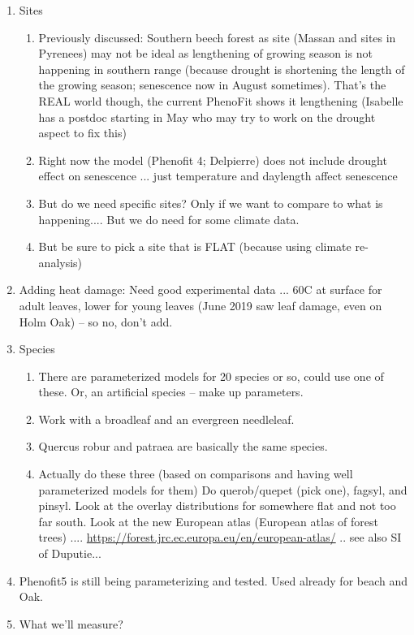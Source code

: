 \documentclass[11pt,letter]{article}
\begin{document}
\begin{enumerate}
\item Sites
\begin{enumerate}
\item Previously discussed: Southern beech forest as site (Massan and sites in Pyrenees) may not be ideal as lengthening of growing season is not happening in southern range (because drought is shortening the length of the growing season; senescence now in August sometimes). That's the REAL world though, the current PhenoFit shows it lengthening (Isabelle has a postdoc starting in May who may try to work on the drought aspect to fix this)
\item Right now the model (Phenofit 4; Delpierre) does not include drought effect on senescence ... just temperature and daylength affect senescence
\item But do we need specific sites? Only if we want to compare to what is happening.... But we do need for some climate data. \item But be sure to pick a site that is FLAT (because using climate re-analysis) 
\end{enumerate}
\item Adding heat damage: Need good experimental data ... 60C at surface for adult leaves, lower for young leaves (June 2019 saw leaf damage, even on Holm Oak) -- so no, don't add. 
\item Species 
\begin{enumerate}
\item There are parameterized models for 20 species or so, could use one of these. Or, an artificial species -- make up parameters. 
\item Work with a broadleaf and an evergreen needleleaf. 
\item Quercus robur and patraea are basically the same species. 
\item Actually do these three (based on comparisons and having well parameterized models for them) Do querob/quepet (pick one), fagsyl, and pinsyl. Look at the overlay distributions for somewhere flat and not too far south. Look at the new European atlas (European atlas of forest trees) .... \url{https://forest.jrc.ec.europa.eu/en/european-atlas/} .. see also SI of Duputie...
\end{enumerate}
\item Phenofit5 is still being parameterizing and tested. Used already for beach and Oak. 
\item What we'll measure? 
\begin{enumerate}

\end{enumerate}
\end{enumerate}
\end{document}
